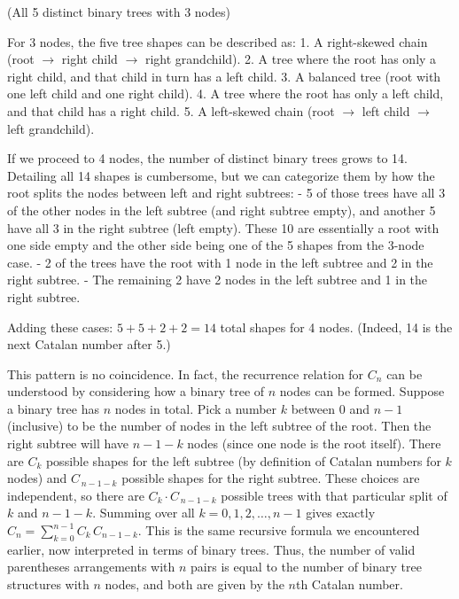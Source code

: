 \documentclass[docmute]{article}
\begin{document}
\vspace{1ex}
\begin{center}
\small (All 5 distinct binary trees with 3 nodes)
\end{center}
\vspace{1ex}

For 3 nodes, the five tree shapes can be described as:
1. A right-skewed chain (root $\to$ right child $\to$ right grandchild).
2. A tree where the root has only a right child, and that child in turn has a left child.
3. A balanced tree (root with one left child and one right child).
4. A tree where the root has only a left child, and that child has a right child.
5. A left-skewed chain (root $\to$ left child $\to$ left grandchild).

If we proceed to 4 nodes, the number of distinct binary trees grows to 14. Detailing all 14 shapes is cumbersome, but we can categorize them by how the root splits the nodes between left and right subtrees:
- 5 of those trees have all 3 of the other nodes in the left subtree (and right subtree empty), and another 5 have all 3 in the right subtree (left empty). These 10 are essentially a root with one side empty and the other side being one of the 5 shapes from the 3-node case.
- 2 of the trees have the root with 1 node in the left subtree and 2 in the right subtree.
- The remaining 2 have 2 nodes in the left subtree and 1 in the right subtree.

Adding these cases: $5 + 5 + 2 + 2 = 14$ total shapes for 4 nodes. (Indeed, 14 is the next Catalan number after 5.)

This pattern is no coincidence. In fact, the recurrence relation for $C_n$ can be understood by considering how a binary tree of $n$ nodes can be formed. Suppose a binary tree has $n$ nodes in total. Pick a number $k$ between $0$ and $n-1$ (inclusive) to be the number of nodes in the left subtree of the root. Then the right subtree will have $n-1-k$ nodes (since one node is the root itself). There are $C_k$ possible shapes for the left subtree (by definition of Catalan numbers for $k$ nodes) and $C_{\,n-1-k}$ possible shapes for the right subtree. These choices are independent, so there are $C_k \cdot C_{\,n-1-k}$ possible trees with that particular split of $k$ and $n-1-k$. Summing over all $k=0,1,2,\dots,n-1$ gives exactly $C_n = \sum_{k=0}^{n-1} C_k\,C_{n-1-k}$. This is the same recursive formula we encountered earlier, now interpreted in terms of binary trees. Thus, the number of valid parentheses arrangements with $n$ pairs is equal to the number of binary tree structures with $n$ nodes, and both are given by the $n$th Catalan number.
\end{document}

